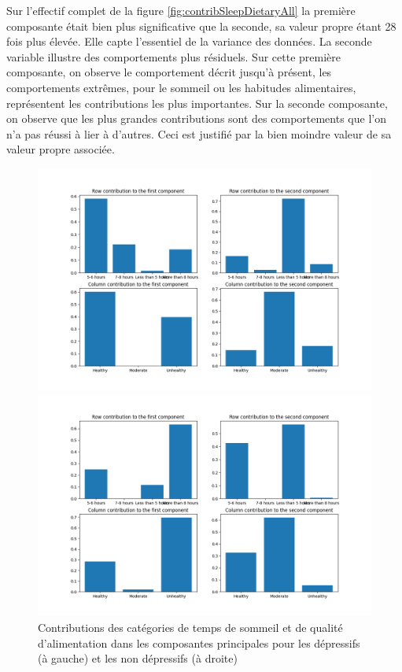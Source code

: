 Sur l’effectif complet de la figure \ref{fig:contribSleepDietaryAll} la première composante était bien plus significative que la seconde, sa valeur propre étant 28 fois plus élevée. Elle capte l’essentiel de la variance des données. La seconde variable illustre des comportements plus résiduels.
Sur cette première composante, on observe le comportement décrit jusqu’à présent, les comportements extrêmes, pour le sommeil ou les habitudes alimentaires, représentent les contributions les plus importantes. Sur la seconde composante, on observe que les plus grandes contributions sont des comportements que l’on n’a pas réussi à lier à d’autres. Ceci est justifié par la bien moindre valeur de sa valeur propre associée.

\begin{figure}[H]
  \centering
  \begin{minipage}{0.5\textwidth}
    \centering
    \includegraphics[width=\linewidth]{Images/Sleep_Dietary_depressive/RowColumnsContributions.png}
  \end{minipage}\hfill
  \begin{minipage}{0.5\textwidth}
    \centering
    \includegraphics[width=\linewidth]{Images/Sleep_Dietary_non_depressive/RowColumnsContributions.png}
  \end{minipage}  
  \caption{Contributions des catégories de temps de sommeil et de qualité d'alimentation dans les composantes principales pour les dépressifs (à gauche) et les non dépressifs (à droite)}
  \label{fig:contribSleepDietary}
\end{figure}

